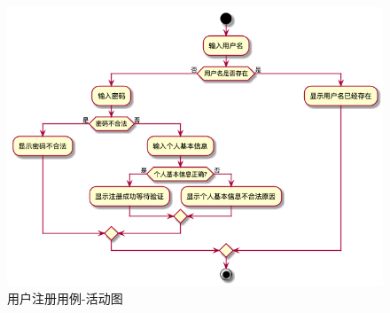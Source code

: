 \begin{figure}[htp]
        \centering
        \includegraphics[width=16cm]{report/figure/usecase_v2/uc_enroll.png}
        \caption{用户注册用例-活动图}
        \label{fig:enroll-uml}
    \end{figure}
    

